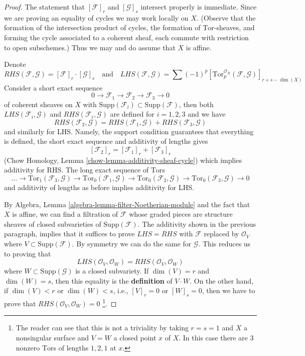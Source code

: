 \begin{proof}
The statement that $[\mathcal{F}]_r$ and $[\mathcal{G}]_s$ intersect properly
is immediate. Since we are proving an equality of cycles we may work
locally on $X$. (Observe that the formation of the intersection
product of cycles, the formation of $\text{Tor}$-sheaves, and
forming the cycle associated to a coherent sheaf, each commute with
restriction to open subschemes.) Thus we may and do assume that $X$ is affine.

\medskip\noindent
Denote
$$
RHS(\mathcal{F}, \mathcal{G}) = [\mathcal{F}]_r \cdot [\mathcal{G}]_s
\quad\text{and}\quad
LHS(\mathcal{F}, \mathcal{G}) = \sum (-1)^p
[\text{Tor}_p^{\mathcal{O}_X}(\mathcal{F}, \mathcal{G})]_{r + s - \dim(X)}
$$
Consider a short exact sequence
$$
0 \to \mathcal{F}_1 \to \mathcal{F}_2 \to \mathcal{F}_3 \to 0
$$
of coherent sheaves on $X$ with
$\text{Supp}(\mathcal{F}_i) \subset \text{Supp}(\mathcal{F})$,
then both $LHS(\mathcal{F}_i, \mathcal{G})$ and
$RHS(\mathcal{F}_i, \mathcal{G})$ are defined for $i = 1, 2, 3$
and we have
$$
RHS(\mathcal{F}_2, \mathcal{G}) =
RHS(\mathcal{F}_1, \mathcal{G}) + RHS(\mathcal{F}_3, \mathcal{G})
$$
and similarly for LHS. Namely, the support condition guarantees that
everything is defined, the short exact sequence and additivity of lengths
gives
$$
[\mathcal{F}_2]_r = [\mathcal{F}_1]_r  + [\mathcal{F}_3]_r
$$
(Chow Homology, Lemma \ref{chow-lemma-additivity-sheaf-cycle})
which implies additivity for RHS. The long exact sequence of $\text{Tor}$s
$$
\ldots \to \text{Tor}_1(\mathcal{F}_3, \mathcal{G}) \to
\text{Tor}_0(\mathcal{F}_1, \mathcal{G}) \to
\text{Tor}_0(\mathcal{F}_2, \mathcal{G}) \to
\text{Tor}_0(\mathcal{F}_3, \mathcal{G}) \to 0
$$
and additivity of lengths as before implies additivity for LHS.

\medskip\noindent
By Algebra, Lemma \ref{algebra-lemma-filter-Noetherian-module}
and the fact that $X$ is affine, we can find a filtration of $\mathcal{F}$
whose graded pieces are structure sheaves of closed subvarieties of
$\text{Supp}(\mathcal{F})$. The additivity shown in the previous paragraph,
implies that it suffices to prove $LHS = RHS$ with
$\mathcal{F}$ replaced by $\mathcal{O}_V$ where
$V \subset \text{Supp}(\mathcal{F})$.
By symmetry we can do the same for $\mathcal{G}$.
This reduces us to proving that
$$
LHS(\mathcal{O}_V, \mathcal{O}_W) = RHS(\mathcal{O}_V, \mathcal{O}_W)
$$
where $W \subset \text{Supp}(\mathcal{G})$ is a closed subvariety.
If $\dim(V) = r$ and $\dim(W) = s$, then this equality is the
{\bf definition} of $V \cdot W$. On the other hand, if
$\dim(V) < r$ or $\dim(W) < s$, i.e., $[V]_r = 0$ or $[W]_s = 0$,
then we have to prove that $RHS(\mathcal{O}_V, \mathcal{O}_W) = 0$
\footnote{The reader can see that this is not a triviality by
taking $r = s = 1$ and $X$ a nonsingular surface and $V = W$
a closed point $x$ of $X$. In this case there are $3$ nonzero
$\text{Tor}$s of lengths $1, 2, 1$ at $x$.}.


\end{proof}
